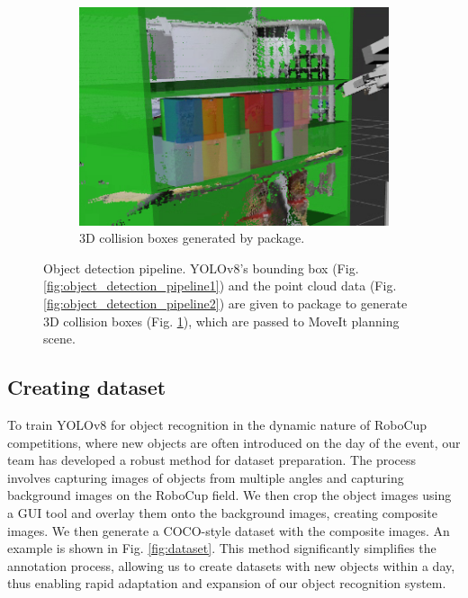 \documentclass[runningheads,a4paper]{llncs}
\begin{document}
\begin{figure}[tbp]
\begin{subfigure}[t]{0.32\linewidth}
		\includegraphics[width=1.0\linewidth]{images/object_detection_pipeline3.png}
		\caption{3D collision boxes generated by  package.}
		\label{fig:object_detection_pipeline3}
	\end{subfigure}
	\caption{Object detection pipeline. YOLOv8's bounding box (Fig. \ref{fig:object_detection_pipeline1}) and the point cloud data (Fig. \ref{fig:object_detection_pipeline2}) are given to  package to generate 3D collision boxes (Fig. \ref{fig:object_detection_pipeline3}), which are passed to MoveIt planning scene.}
	\label{fig:object_detection_pipeline}
\end{figure}

\subsection{Creating dataset}
To train YOLOv8 for object recognition in the dynamic nature of RoboCup competitions, where new objects are often introduced on the day of the event, our team has developed a robust method for dataset preparation.
The process involves capturing images of objects from multiple angles and capturing background images on the RoboCup field.
We then crop the object images using a GUI tool and overlay them onto the background images, creating composite images.
We then generate a COCO-style dataset with the composite images.
An example is shown in Fig. \ref{fig:dataset}.
This method significantly simplifies the annotation process, allowing us to create datasets with new objects within a day, thus enabling rapid adaptation and expansion of our object recognition system.
\end{document}
